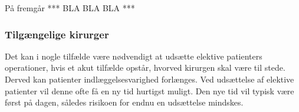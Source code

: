 %

\noindent
På  fremgår *** BLA BLA BLA ***



\subsubsection{Tilgængelige kirurger}
Det kan i nogle tilfælde være nødvendigt at udsætte elektive patienters operationer, hvis et akut tilfælde opstår, hvorved kirurgen skal være til stede. Derved kan patienter indlæggelsesvarighed forlænges. Ved udsættelse af elektive patienter vil denne ofte få en ny tid hurtigst muligt. Den nye tid vil typisk være først på dagen, således risikoen for endnu en udsættelse mindskes.